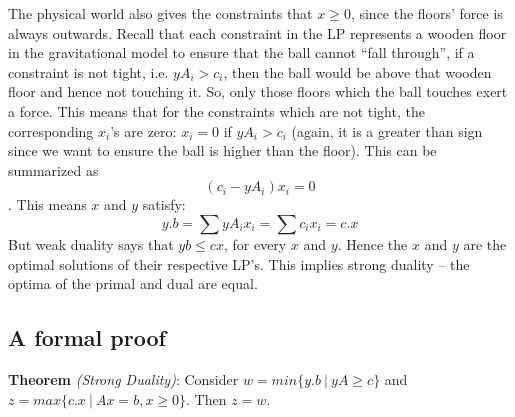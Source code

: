 \documentclass[11pt]{article}
\begin{document}
The physical world also gives the constraints that $x\geq 0$, since the floors' force is always outwards. Recall that each constraint in the LP represents a wooden floor in the gravitational model to ensure that the ball cannot ``fall through'', if a constraint is not tight, i.e. $yA_i >c_i$, then the ball would be above that wooden floor and hence not touching it. So, only those floors which the ball touches exert a force. This means that for the constraints which are not tight, the corresponding $x_i$'s are zero: $x_i=0$ if $yA_i>c_i$ (again, it is a greater than sign since we want to ensure the ball is higher than the floor). This can be summarized as \[(c_i-yA_i)x_i=0\]. This means $x$ and $y$ satisfy:\[y.b=\sum yA_ix_i=\sum c_ix_i=c.x\] But weak duality says that $yb \leq cx$, for every $x$ and $y$. Hence the $x$ and $y$ are the optimal solutions of their respective LP's. This implies strong duality -- the optima of the primal and dual are equal.

\subsection{A formal proof}

\textbf{Theorem} \emph{(Strong Duality)}:
Consider $w = min \{y.b\ |\ yA \geq c\}$ and $z = max \{c.x\ |\ Ax = b, x \geq 0 \}$. Then $z = w$. 
\end{document}

